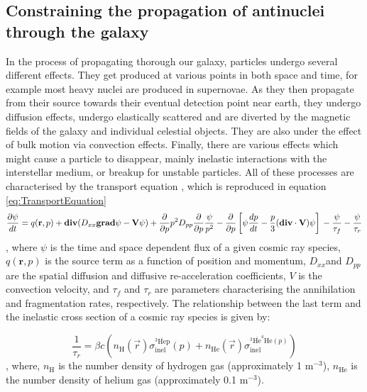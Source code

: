 \subsection{Constraining the propagation of antinuclei through the galaxy}\label{sec:Propagation}
In the process of propagating thorough our galaxy, particles undergo several different effects. They get produced at various points in both space and time, for example most heavy nuclei are produced in supernovae\cite{}. As they then propagate from their source towards their eventual detection point near earth, they undergo diffusion effects, undergo elastically scattered and are diverted by the magnetic fields of the galaxy and individual celestial objects. They are also under the effect of bulk motion via convection effects. Finally, there are various effects which might cause a particle to disappear, mainly inelastic interactions with the interstellar medium, or breakup for unstable particles. All of these processes are characterised by the transport equation \cite{}, which is reproduced in equation \ref{eq:TransportEquation}
\begin{equation}
    \label{eq:TransportEquation}
    \frac{\partial\psi}{dt} = q(\textbf{r},p) + \mathrm{\textbf{div}}(D_{xx}\mathrm{\textbf{grad}}\psi - \textbf{V}\psi) + \frac{\partial}{\partial p}p^2D_{pp} \frac{\partial}{\partial p}\frac{\psi}{p^2} - \frac{\partial}{\partial p} \left[ \psi \frac{dp}{d t}   -\frac{p}{3} (\mathrm{\textbf{div}}\cdot  \mathrm{\textbf{V}} )\psi              \right] \\ - \frac{\psi}{\tau_f}-\frac{\psi}{\tau_r}
\end{equation}
, where $\psi$ is the time and space dependent flux of a given cosmic ray species, $q(\textbf{r},p)$ is the source term as a function of position and momentum, $D_{xx}$and $D_{pp}$ are the spatial diffusion and diffusive re-acceleration coefficients, $V$ is the convection velocity, and $\tau_f$ and $\tau_r$ are parameters characterising the annihilation and fragmentation rates, respectively. The relationship between the last term and the inelastic cross section of a cosmic ray species is given by: 

\begin{equation}\label{eq:annihilation_lossTerm_relation}
    \frac{1}{\tau_r} = \beta c \left( n_\mathrm{H}(\vec{r})\sigma_{\mathrm{inel}}^{^3\mathrm{\overline{He}p}} (p) + n_{\mathrm{He}}(\vec{r})\sigma_{\mathrm{inel}}^{^3\mathrm{\overline{He}^4He} (p)} 
    \right)
\end{equation},
where, $n_\mathrm{H}$ is the number density of hydrogen gas (approximately 1 m$^{-3}$), $n_\mathrm{He}$ is the number density of helium gas (approximately 0.1 m$^{-3}$). \\%

